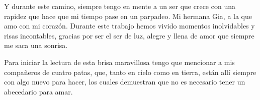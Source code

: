 \documentclass[a4paper,12pt,openany,twoside,spanish]{book}
\makeatletter
\renewcommand\mainmatter{\clearpage\@mainmattertrue\pagenumbering{arabic}}
\renewcommand\backmatter{\clearpage\@mainmatterfalse}
\newcommand{\hojablanca}{%
  \clearpage
  \thispagestyle{empty}%
  \mbox{}%
  \clearpage
}
\makeatother
\begin{document}
Y durante este camino, siempre tengo en mente a un ser que crece con una rapidez que hace que mi tiempo pase en un parpadeo. Mi hermana Gia, a la que amo con mi corazón. Durante este trabajo hemos vivido momentos inolvidables y risas incontables, gracias por ser el ser de luz, alegre y llena de amor que siempre me saca una sonrisa.

Para iniciar la lectura de esta brisa maravillosa tengo que mencionar a mis compañeros de cuatro patas, que, tanto en cielo como en tierra, están allí siempre con algo nuevo para hacer, los cuales demuestran que no es necesario tener un abecedario para amar. 

\hojablanca



\hojablanca

\tableofcontents
\listoffigures

\hojablanca

\mainmatter
\pagestyle{fancy}









\backmatter
{}

\printindex


\end{document}
